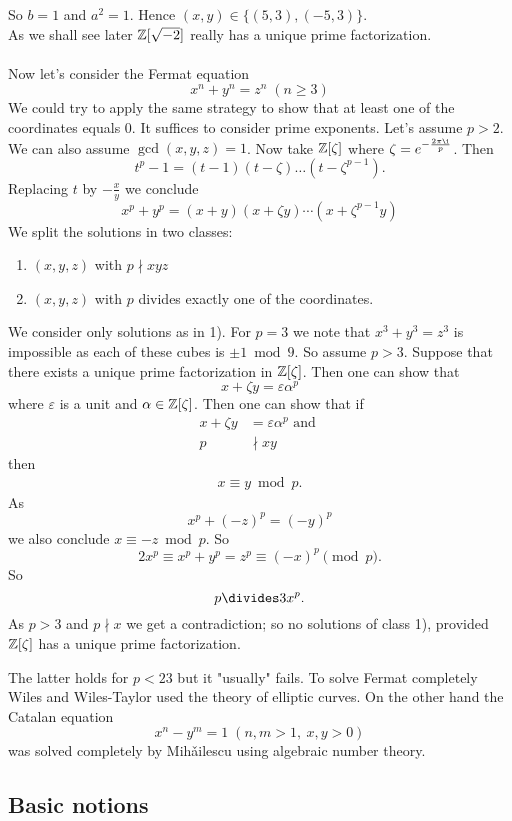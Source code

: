 \documentclass[NumTh.tex]{subfiles}
\begin{document}
So $b = 1$ and $a^2 = 1$.
Hence $(x,y) \in \{(5,3), (-5,3)\}$.
\\
As we shall see later $\mathbb{Z}[\sqrt{-2}]$ really has a unique prime factorization.\\
\\
Now let's consider the Fermat equation
\[ x^n + y^n = z^n \; (n\geq 3) \]
We could try to apply the same strategy to show that at least one of the coordinates equals $0$.
It suffices to consider prime exponents. Let's assume $p > 2$.
We can also assume $\gcd(x,y,z) = 1$.
Now take $\mathbb{Z}[\zeta]$ where $\zeta = e^{-\frac{2\pi \i}{p}}$.
Then
\[ t^p - 1 = (t-1)(t-\zeta)\dots (t-\zeta^{p-1}) \text{.} \]
Replacing $t$ by $- \frac{x}{y}$ we conclude
\[ x^p + y^p = (x+y)(x + \zeta y) \cdots (x + \zeta^{p-1}y) \]
We split the solutions in two classes:
\begin{enumerate}
  \item $(x,y,z)$ with $p \nmid xyz$
  \item $(x,y,z)$ with $p$ divides exactly one of the coordinates.
\end{enumerate}
We consider only solutions as in 1).
For $p = 3$ we note that $x^3 + y^3 = z^3$ is impossible as each of these cubes is $\pm 1 \bmod 9$.
So assume $p>3$.
Suppose that there exists a unique prime factorization in $\mathbb{Z}[\zeta]$. 
Then one can show that 
\[ x + \zeta y = \varepsilon \alpha^p \] 
where $\varepsilon$ is a unit and $\alpha \in \mathbb{Z}[\zeta]$.
Then one can show that if
\begin{align*}
  x+ \zeta y &= \varepsilon \alpha^p \text{ and } \\ 
  p &\nmid xy
\end{align*}
then
\begin{align*}
  x \equiv y \bmod p \text{.}
\end{align*}
As 
\[ x^p + (-z)^p = (-y)^p\]
we also conclude $x  \equiv -z \bmod p$.
So 
\[ 2x^p \equiv x^p + y^p = z^p \equiv (-x)^p \pmod p \text{.} \]
So 
\[ p \divides 3 x^p \text{.} \]
As $p > 3$ and $p \nmid x$ we get a contradiction; so no solutions of class 1), provided $\mathbb{Z}[\zeta]$ has a unique prime factorization.

The latter holds for $p < 23$ but it "usually" fails.
To solve Fermat completely Wiles and Wiles-Taylor used the theory of elliptic curves.
On the other hand the Catalan equation
\[ x^n - y^m = 1 \; (n,m > 1,\:x,y >0) \]
was solved completely by Mih\v{a}ilescu using algebraic number theory.

\subsection{Basic notions}
\end{document}
